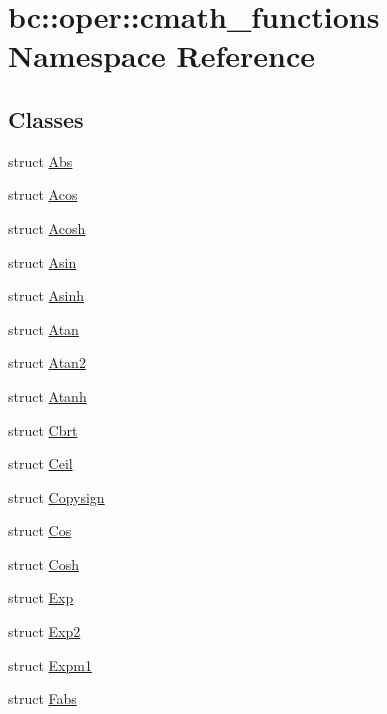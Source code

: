 \hypertarget{namespacebc_1_1oper_1_1cmath__functions}{}\section{bc\+:\+:oper\+:\+:cmath\+\_\+functions Namespace Reference}
\label{namespacebc_1_1oper_1_1cmath__functions}
\subsection*{Classes}
\begin{DoxyCompactItemize}
\item 
struct \hyperlink{structbc_1_1oper_1_1cmath__functions_1_1Abs}{Abs}
\item 
struct \hyperlink{structbc_1_1oper_1_1cmath__functions_1_1Acos}{Acos}
\item 
struct \hyperlink{structbc_1_1oper_1_1cmath__functions_1_1Acosh}{Acosh}
\item 
struct \hyperlink{structbc_1_1oper_1_1cmath__functions_1_1Asin}{Asin}
\item 
struct \hyperlink{structbc_1_1oper_1_1cmath__functions_1_1Asinh}{Asinh}
\item 
struct \hyperlink{structbc_1_1oper_1_1cmath__functions_1_1Atan}{Atan}
\item 
struct \hyperlink{structbc_1_1oper_1_1cmath__functions_1_1Atan2}{Atan2}
\item 
struct \hyperlink{structbc_1_1oper_1_1cmath__functions_1_1Atanh}{Atanh}
\item 
struct \hyperlink{structbc_1_1oper_1_1cmath__functions_1_1Cbrt}{Cbrt}
\item 
struct \hyperlink{structbc_1_1oper_1_1cmath__functions_1_1Ceil}{Ceil}
\item 
struct \hyperlink{structbc_1_1oper_1_1cmath__functions_1_1Copysign}{Copysign}
\item 
struct \hyperlink{structbc_1_1oper_1_1cmath__functions_1_1Cos}{Cos}
\item 
struct \hyperlink{structbc_1_1oper_1_1cmath__functions_1_1Cosh}{Cosh}
\item 
struct \hyperlink{structbc_1_1oper_1_1cmath__functions_1_1Exp}{Exp}
\item 
struct \hyperlink{structbc_1_1oper_1_1cmath__functions_1_1Exp2}{Exp2}
\item 
struct \hyperlink{structbc_1_1oper_1_1cmath__functions_1_1Expm1}{Expm1}
\item 
struct \hyperlink{structbc_1_1oper_1_1cmath__functions_1_1Fabs}{Fabs}

\end{DoxyCompactItemize}
